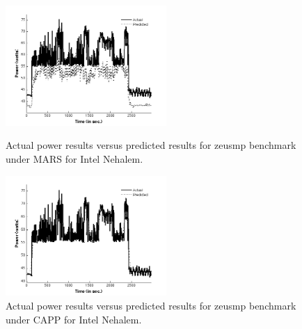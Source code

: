 \documentclass[times,10pt,finalversion]{usetex-v1}
\begin{document}
\begin{figure}[bth]
  \begin{minipage}[b]{0.5\linewidth}
    \centering
    \includegraphics[width=1.0\linewidth,height=1.8in]{intelzeusmars}
    \caption{Actual power results versus predicted results for zeusmp
      benchmark under MARS for Intel Nehalem.}
    \label{fig:intelzeusmars}
  \end{minipage}\quad
  \begin{minipage}[b]{0.5\linewidth}
    \centering
    \includegraphics[width=1.0\linewidth,height=1.8in]{intelzeuspredict}
    \caption{Actual power results versus predicted results for zeusmp
      benchmark under CAPP for Intel Nehalem.}
    \label{fig:intelzeuspredict}
  \end{minipage}
\end{figure}
\end{document}

